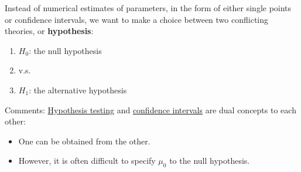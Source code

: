 \begin{frame}
Instead of numerical estimates of parameters, in the form of either single points or confidence intervals, we want to make a choice between two conflicting theories, or {\bf hypothesis}:
\pause
\vfill
\begin{enumerate}
 \item $H_0$: the null hypothesis
 \item[] \hspace{3em} v.s.
 \item $H_1$: the alternative hypothesis
\end{enumerate}
\pause
\vfill
Comments:
\underline{Hypothesis testing} and \underline{confidence intervals} are dual concepts to each other:
\begin{itemize}
	\item One can be obtained from the other.
	\item However, it is often difficult to specify $\mu_0$ to the null hypothesis.
\end{itemize}
\end{frame}

